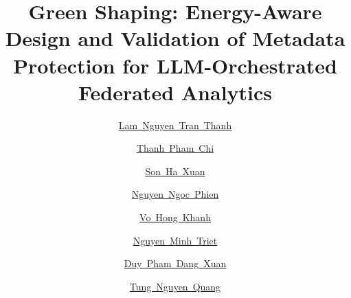 \documentclass[5p,times]{elsarticle}
\begin{document}
\begin{frontmatter}

\title{Green Shaping: Energy-Aware Design and Validation of Metadata Protection for LLM-Orchestrated Federated Analytics}

\author[aff1]{\mbox{\href{https://orcid.org/0000-0003-0991-6157}{Lam Nguyen Tran Thanh}}}
\author[aff2]{\mbox{\href{https://orcid.org/0000-0002-5674-7985}{Thanh Pham Chi}}}
\author[aff3]{\mbox{\href{https://orcid.org/0000-0002-5336-0566}{Son Ha Xuan}}}
\author[aff4]{\mbox{\href{https://orcid.org/0000-0001-9152-6208}{Nguyen Ngoc Phien}}}
\author[aff5]{\mbox{\href{https://orcid.org/0009-0000-2881-0943}{Vo Hong Khanh}}}
\author[aff5]{\mbox{\href{https://orcid.org/0009-0009-4235-584X}{Nguyen Minh Triet}}}
\author[aff6]{\mbox{\href{https://orcid.org/0009-0009-0116-1619}{Duy Pham Dang Xuan}}}
\author[aff6]{\mbox{\href{https://orcid.org/0009-0003-5046-5535}{Tung Nguyen Quang}}}
\address[aff1]{Ho Chi Minh City University of Technology and Engineering, 01 Vo Van Ngan Street, Thu Duc Ward, Ho Chi Minh City, Vietnam}
\address[aff2]{Electronic and Computer Systems Engineering (SSET), RMIT, SGS campus, Vietnam}
\address[aff3]{Digital Economy, The Business School (TBS), RMIT, Ho Chi Minh City, Vietnam}
\address[aff4]{Center for Applied Information Technology and Faculty of Information Technology, Ton Duc Thang University, Ho Chi Minh City, Vietnam}
\address[aff5]{FPT University, Cantho Campus, Vietnam}
\address[aff6]{FPT University, Ho Chi Minh City Campus, Vietnam}


\end{frontmatter}
\end{document}
